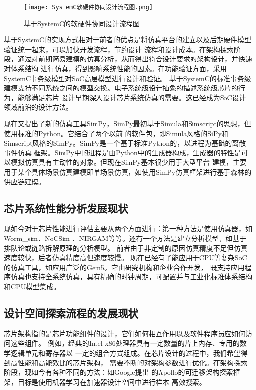 \begin{figure}
    \centering
    \texttt{[image: SystemC软硬件协同设计流程图.png]}
    \caption{基于SystemC的软硬件协同设计流程图}
    \label{fig:badge}
\end{figure}

基于SystemC的实现方式相对于前者的优点是将仿真平台的建立以及后期硬件模型验证统一起来，可以加快开发流程，节约设计
流程和设计成本。在架构探索阶段，通过对前期简易建模的仿真分析，从而得出符合设计要求的架构设计，并快速对体系结构
进行仿真，得到影响系统性能的因素。在功能验证方面，采用SystemC事务级模型对SoC高层模型进行设计和验证\cite{8}。
基于SystemC的标准事务级建模支持不同系统之间的模型交换。电子系统级设计抽象的描述系统级芯片的行为，能够满足芯片
设计早期深入设计芯片系统仿真的需要\cite{9}。这已经成为SoC设计领域前沿的设计方法。

现在又提出了新的仿真工具SimPy，SimPy最初基于Simula和Simscript的思想，但使用标准的Python。它结合了两个以前
的软件包，即Simula风格的SiPy和Simscript风格的SimPy。SimPy是一个基于标准Python的，以进程为基础的离散事件仿真
框架。SimPy中的进程是由Python中的生成器构成，生成器的特性是可以模拟仿真具有主动性的对象。但现在SimPy基本很少用于大型平台
建模，主要用于某个具体场景仿真建模即单场景仿真\cite{10}，如使用SimPy仿真框架进行基于森林的供应链建模\cite{11}。

\subsection{芯片系统性能分析发展现状}
现如今对于芯片性能进行评估主要从两个方面进行：第一种方法是使用仿真器，如Worm\_sim、NoCSim
、NIRGAM等等。还有一个方法是建立分析模型，如基于排队论或链路拆解原理的分析模型\cite{39}。
前者由于非定制的原因仿真精度不足但仿真速度较快，后者仿真精度高但速度较慢。
现在已经有了能应用于CPU等复杂SoC的仿真工具，如应用广泛的Gem5\cite{12}。它由研究机构和企业合作开发，
既支持应用程序仿真也支持全系统仿真，具有精确的时钟周期，可配置并与工业化标准体系结构和CPU模型集成。

\subsection{设计空间探索流程的发展现状}
芯片架构指的是芯片功能组件的设计，它们如何相互作用以及软件程序员应如何访问这些组件。
例如，经典的Intel x86处理器具有一定数量的片上内存、专用的数学逻辑单元和寄存器以
一定的组合方式组成。在芯片设计的过程中，我们希望得到高性能和高能效比的芯片架构，
需要不断的对架构参数进行优化。在架构探索阶段，现如今有各种不同的方法：如Google提出
的Apollo的可迁移架构探索框架\cite{43}，目标是使用机器学习在加速器设计空间中进行样本
高效搜索。

